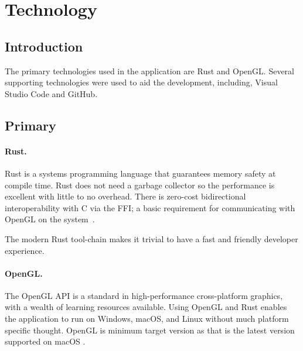 
\section{Technology}\label{sec:technology}

\subsection{Introduction}
The primary technologies used in the application are Rust and OpenGL\@.
Several supporting technologies were used to aid the development, including, Visual Studio Code and GitHub.

\subsection{Primary}

\paragraph{ Rust.}
Rust is a systems programming language that guarantees memory safety at compile time.
Rust does not need a garbage collector so the performance is excellent with little to no overhead.
There is zero-cost bidirectional interoperability with C via the FFI\@;
a basic requirement for communicating with OpenGL on the system~\autocite{rust_programming_language_rust_2020}.

The modern Rust tool-chain makes it trivial to have a fast and friendly developer experience.

\paragraph{OpenGL.}
The OpenGL API is a standard in high-performance cross-platform graphics, with a wealth of learning resources available.
Using OpenGL and Rust enables the application to run on Windows, macOS, and Linux without much platform specific thought. OpenGL  is minimum target version as that is the latest version supported on macOS \autocite{opengl_opengl_2020}.

